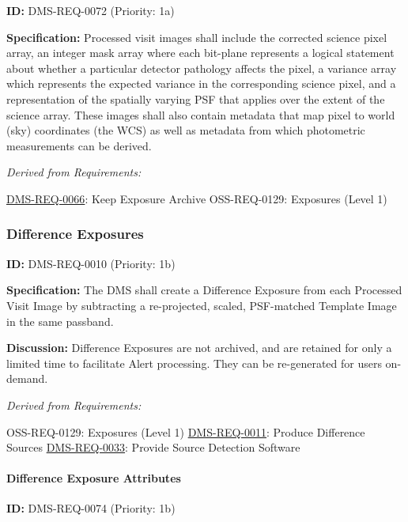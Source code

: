 \documentclass[SE,toc,lsstdraft]{lsstdoc}
\begin{document}
\label{DMS-REQ-0072}
\textbf{ID:} DMS-REQ-0072 (Priority: 1a)

\textbf{Specification:} Processed visit images shall include the corrected science pixel array, an integer mask array where each bit-plane represents a logical statement about whether a particular detector pathology affects the pixel, a variance array which represents the expected variance in the corresponding science pixel, and a representation of the spatially varying PSF that applies over the extent of the science array. These images shall also contain metadata that map pixel to world (sky) coordinates (the WCS) as well as metadata from which photometric measurements can be derived.

\emph{Derived from Requirements:}

\hyperref[DMS-REQ-0066]{DMS-REQ-0066}:
Keep Exposure Archive \newline
OSS-REQ-0129:
Exposures (Level 1) \newline

\subsubsection{Difference Exposures}

\label{DMS-REQ-0010}
\textbf{ID:} DMS-REQ-0010 (Priority: 1b)

\textbf{Specification:} The DMS shall create a Difference Exposure from each Processed Visit Image by subtracting a re-projected, scaled, PSF-matched Template Image in the same passband.

\textbf{Discussion:} Difference Exposures are not archived, and are retained for only a limited time to facilitate Alert processing. They can be re-generated for users on-demand.

\emph{Derived from Requirements:}

OSS-REQ-0129:
Exposures (Level 1) \newline
\hyperref[DMS-REQ-0011]{DMS-REQ-0011}:
Produce Difference Sources \newline
\hyperref[DMS-REQ-0033]{DMS-REQ-0033}:
Provide Source Detection Software \newline

\paragraph{Difference Exposure Attributes}\hfill  %

\label{DMS-REQ-0074}
\textbf{ID:} DMS-REQ-0074 (Priority: 1b)
\end{document}
